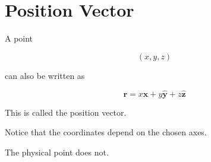 \section{Position Vector}

A point

\[
(x,y,z)
\]

can also be written as

\[
\boxed{
	\mathbf r
	=
	x\hat{\mathbf x}
	+
	y\hat{\mathbf y}
	+
	z\hat{\mathbf z}
}
\]

This is called the position vector.

Notice that the coordinates depend on the chosen axes.

The physical point does not.

